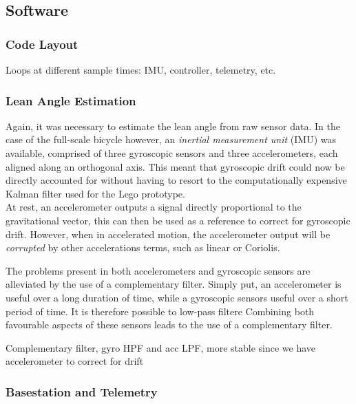 \subsection{Software}

\subsubsection{Code Layout}
Loops at different sample times: IMU, controller, telemetry, etc.

\subsubsection{Lean Angle Estimation}
Again, it was necessary to estimate the lean angle from raw sensor data. In the case of the full-scale bicycle however, an \textit{inertial measurement unit} (IMU) was available, comprised of three gyroscopic sensors and three accelerometers, each aligned along an orthogonal axis. This meant that gyroscopic drift could now be directly accounted for without having to resort to the computationally expensive Kalman filter used for the Lego prototype.\\

At rest, an accelerometer outputs a signal directly proportional to the gravitational vector, this can then be used as a reference to correct for gyroscopic drift. However, when in accelerated motion, the accelerometer output will be \textit{corrupted} by other accelerations terms, such as linear or Coriolis.

The problems present in both accelerometers and gyroscopic sensors are alleviated by the use of a complementary filter. Simply put, an accelerometer is useful over a long duration of time, while a gyroscopic sensors useful over a short period of time. It is therefore possible to low-pass filtere Combining both favourable aspects of these sensors leads to the use of a complementary filter. 

Complementary filter, gyro HPF and acc LPF, more stable since we have accelerometer to correct for drift

\subsubsection{Basestation and Telemetry}

